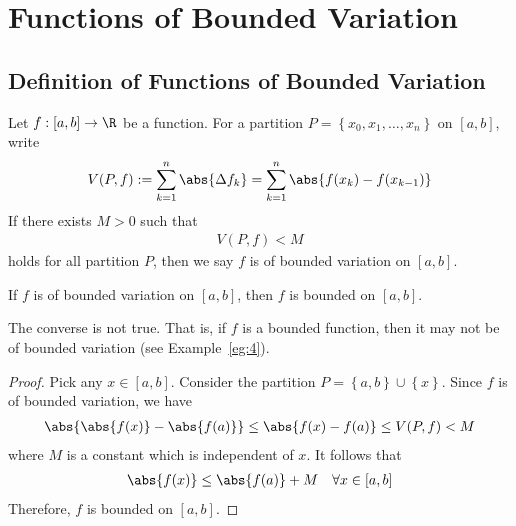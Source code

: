 \documentclass[thmcnt=section, 12pt]{elegantbook}
\begin{document}

\chapter{Functions of Bounded Variation} %


\section{Definition of Functions of Bounded Variation}


\begin{definition}
    Let $f: [a, b] \to \R$ be a function. For a partition $P = \left\{x_0, x_1, \ldots, x_n\right\}$ on $[a, b]$, write
    \begin{align*}
        V(P, f) := \sum_{k=1}^n \abs{\Delta f_k} = \sum_{k=1}^n \abs{f(x_k) - f(x_{k-1})}
    \end{align*}
    If there exists $M > 0$ such that
    \begin{align*}
        V(P, f) < M
    \end{align*}
    holds for all partition $P$, then we say $f$ is of bounded variation on $[a, b]$.
\end{definition}


\begin{theorem} \label{thm:30}
    If $f$ is of bounded variation on $[a, b]$, then $f$ is bounded on $[a, b]$.
\end{theorem}

\begin{remark}
    The converse is not true. That is, if $f$ is a bounded function, then it may not be of bounded variation (see Example~\ref{eg:4}).
\end{remark}

\begin{proof}
    Pick any $x \in [a, b]$. Consider the partition $P = \left\{a, b\right\} \cup \left\{x\right\}$. Since $f$ is of bounded variation, we have 
    \begin{align*}
        \abs{\abs{f(x)} - \abs{f(a)}}
        \leq \abs{f(x) - f(a)}
        \leq V(P, f)
        < M
    \end{align*}
    where $M$ is a constant which is independent of $x$. It follows that 
    \begin{align*}
        \abs{f(x)} \leq \abs{f(a)} + M
        \quad \forall x \in [a, b]
    \end{align*}
    Therefore, $f$ is bounded on $[a, b]$.
\end{proof}
\end{document}
